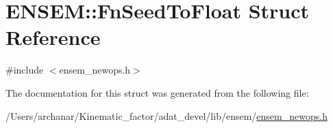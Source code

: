 \hypertarget{structENSEM_1_1FnSeedToFloat}{}\section{E\+N\+S\+EM\+:\+:Fn\+Seed\+To\+Float Struct Reference}
\label{structENSEM_1_1FnSeedToFloat}


{\ttfamily \#include $<$ensem\+\_\+newops.\+h$>$}



The documentation for this struct was generated from the following file\+:\begin{DoxyCompactItemize}
\item 
/\+Users/archanar/\+Kinematic\+\_\+factor/adat\+\_\+devel/lib/ensem/\mbox{\hyperlink{lib_2ensem_2ensem__newops_8h}{ensem\+\_\+newops.\+h}}\end{DoxyCompactItemize}
